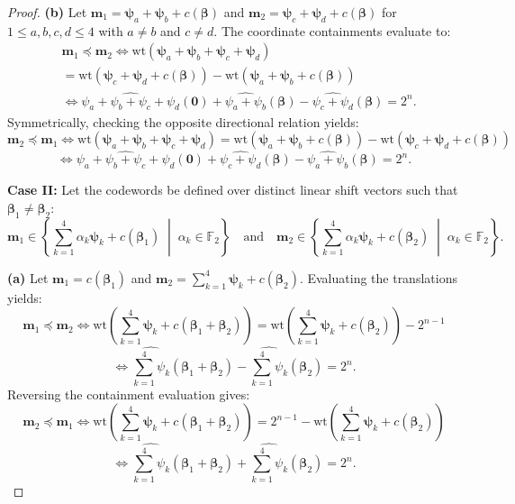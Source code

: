 \documentclass[10pt,a4paper]{amsart}
\begin{document}
\begin{proof}
\textbf{(b)} Let $\mathbf{m}_1 = \mathbf{\psi}_a + \mathbf{\psi}_b + c(\mathbf{\beta})$ and $\mathbf{m}_2 = \mathbf{\psi}_c + \mathbf{\psi}_d + c(\mathbf{\beta})$ for $1 \le a,b,c,d \le 4$ with $a \neq b$ and $c \neq d$. The coordinate containments evaluate to:
\begin{align*}
&\mathbf{m}_1 \preceq \mathbf{m}_2 \Leftrightarrow 
\mathrm{wt}(\mathbf{\psi}_a + \mathbf{\psi}_b + \mathbf{\psi}_c + \mathbf{\psi}_d) \\
&= \mathrm{wt}(\mathbf{\psi}_c + \mathbf{\psi}_d + c(\mathbf{\beta})) - \mathrm{wt}(\mathbf{\psi}_a + \mathbf{\psi}_b + c(\mathbf{\beta}))\\
&\Leftrightarrow \widehat{\psi_a + \psi_b + \psi_c + \psi_d}(\mathbf{0}) + \widehat{\psi_a + \psi_b}(\mathbf{\beta}) - \widehat{\psi_c + \psi_d}(\mathbf{\beta}) = 2^n.
\end{align*}
Symmetrically, checking the opposite directional relation yields:
\[
\mathbf{m}_2 \preceq \mathbf{m}_1 \Leftrightarrow 
\mathrm{wt}(\mathbf{\psi}_a + \mathbf{\psi}_b + \mathbf{\psi}_c + \mathbf{\psi}_d) 
= \mathrm{wt}(\mathbf{\psi}_a + \mathbf{\psi}_b + c(\mathbf{\beta})) - \mathrm{wt}(\mathbf{\psi}_c + \mathbf{\psi}_d + c(\mathbf{\beta}))
\]
\[
\Leftrightarrow \widehat{\psi_a + \psi_b + \psi_c + \psi_d}(\mathbf{0}) + \widehat{\psi_c + \psi_d}(\mathbf{\beta}) - \widehat{\psi_a + \psi_b}(\mathbf{\beta}) = 2^n.
\]

\textbf{Case II:} Let the codewords be defined over distinct linear shift vectors such that $\mathbf{\beta}_1 \neq \mathbf{\beta}_2$:
\[
\mathbf{m}_1 \in \left\{\sum_{k=1}^{4} \alpha_k \mathbf{\psi}_k + c(\mathbf{\beta}_1) \;\middle|\; \alpha_k \in \mathbb{F}_2 \right\} \quad \text{and} \quad \mathbf{m}_2 \in \left\{\sum_{k=1}^{4} \alpha_k \mathbf{\psi}_k + c(\mathbf{\beta}_2) \;\middle|\; \alpha_k \in \mathbb{F}_2 \right\}.
\]

\textbf{(a)} Let $\mathbf{m}_1 = c(\mathbf{\beta}_1)$ and $\mathbf{m}_2 = \sum_{k=1}^{4} \mathbf{\psi}_k + c(\mathbf{\beta}_2)$. Evaluating the translations yields:
\[
\mathbf{m}_1 \preceq \mathbf{m}_2 \Leftrightarrow 
\mathrm{wt}\!\left(\sum_{k=1}^{4} \mathbf{\psi}_k + c(\mathbf{\beta}_1 + \mathbf{\beta}_2)\right)
= \mathrm{wt}\!\left(\sum_{k=1}^{4} \mathbf{\psi}_k + c(\mathbf{\beta}_2)\right) - 2^{n-1}
\]
\[
\Leftrightarrow \widehat{\sum_{k=1}^{4} \psi_k}(\mathbf{\beta}_1 + \mathbf{\beta}_2) - \widehat{\sum_{k=1}^{4} \psi_k}(\mathbf{\beta}_2) = 2^n.
\]
Reversing the containment evaluation gives:
\[
\mathbf{m}_2 \preceq \mathbf{m}_1 \Leftrightarrow 
\mathrm{wt}\!\left(\sum_{k=1}^{4} \mathbf{\psi}_k + c(\mathbf{\beta}_1 + \mathbf{\beta}_2)\right)
= 2^{n-1} - \mathrm{wt}\!\left(\sum_{k=1}^{4} \mathbf{\psi}_k + c(\mathbf{\beta}_2)\right)
\]
\[
\Leftrightarrow \widehat{\sum_{k=1}^{4} \psi_k}(\mathbf{\beta}_1 + \mathbf{\beta}_2) + \widehat{\sum_{k=1}^{4} \psi_k}(\mathbf{\beta}_2) = 2^n.
\]


\end{proof}
\end{document}
